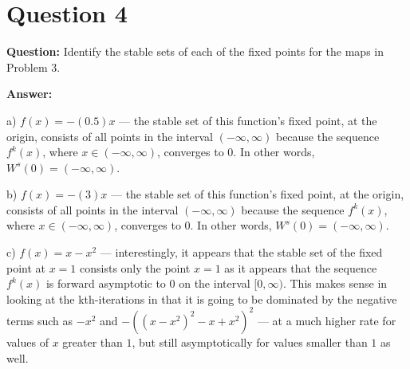 \documentclass[12pt]{article}
\newenvironment{myenv}{\begin{adjustwidth}{1cm}{}}{\end{adjustwidth}}
\begin{document}
\section*{Question 4}
\begin{myenv}
\textbf{Question:} Identify the stable sets of each of the fixed points for the maps in Problem 3.

\textbf{Answer:}

a) $f(x) = -(0.5)x$ --- the stable set of this function's fixed point, at the origin, consists of all points in the interval $(-\infty, \infty)$ because the sequence $f^k(x)$, where $x \in (-\infty,\infty)$, converges to 0. In other words, $W^s(0) = (-\infty,\infty)$.

b) $f(x) = -(3)x$ --- the stable set of this function's fixed point, at the origin, consists of all points in the interval $(-\infty, \infty)$ because the sequence $f^k(x)$, where $x \in (-\infty,\infty)$, converges to 0. In other words, $W^s(0) = (-\infty,\infty)$.

c) $f(x) = x-x^2$ --- interestingly, it appears that the stable set of the fixed point at $x=1$ consists only the point $x=1$ as it appears that the sequence $f^k(x)$ is forward asymptotic to $0$ on the interval $[0,\infty)$. This makes sense in looking at the kth-iterations in that it is going to be dominated by the negative terms such as $-x^2$ and $-((x-x^2)^2-x+x^2)^2$ --- at a much higher rate for values of $x$ greater than $1$, but still asymptotically for values smaller than $1$ as well.

\end{myenv}
\end{document}
